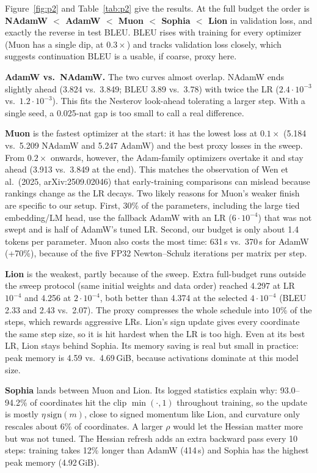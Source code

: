 \documentclass[11pt,a4paper]{article}
\begin{document}
Figure~\ref{fig:p2} and Table~\ref{tab:p2} give the results. At the full budget the order is \textbf{NAdamW $<$ AdamW $<$ Muon $<$ Sophia $<$ Lion} in validation loss, and exactly the reverse in test BLEU. BLEU rises with training for every optimizer (Muon has a single dip, at $0.3\times$) and tracks validation loss closely, which suggests continuation BLEU is a usable, if coarse, proxy here.

\textbf{AdamW vs.\ NAdamW.} The two curves almost overlap. NAdamW ends slightly ahead (3.824 vs.\ 3.849; BLEU 3.89 vs.\ 3.78) with twice the LR ($2.4\cdot10^{-3}$ vs.\ $1.2\cdot10^{-3}$). This fits the Nesterov look-ahead tolerating a larger step. With a single seed, a 0.025-nat gap is too small to call a real difference.

\textbf{Muon} is the fastest optimizer at the start: it has the lowest loss at $0.1\times$ (5.184 vs.\ 5.209 NAdamW and 5.247 AdamW) and the best proxy losses in the sweep. From $0.2\times$ onwards, however, the Adam-family optimizers overtake it and stay ahead (3.913 vs.\ 3.849 at the end). This matches the observation of Wen et al.\ (2025, arXiv:2509.02046) that early-training comparisons can mislead because rankings change as the LR decays. Two likely reasons for Muon's weaker finish are specific to our setup. First, 30\% of the parameters, including the large tied embedding/LM head, use the fallback AdamW with an LR ($6\cdot10^{-4}$) that was not swept and is half of AdamW's tuned LR. Second, our budget is only about 1.4 tokens per parameter. Muon also costs the most time: 631\,s vs.\ 370\,s for AdamW (+70\%), because of the five FP32 Newton--Schulz iterations per matrix per step.

\textbf{Lion} is the weakest, partly because of the sweep. Extra full-budget runs outside the sweep protocol (same initial weights and data order) reached 4.297 at LR $10^{-4}$ and 4.256 at $2\cdot10^{-4}$, both better than 4.374 at the selected $4\cdot10^{-4}$ (BLEU 2.33 and 2.43 vs.\ 2.07). The proxy compresses the whole schedule into 10\% of the steps, which rewards aggressive LRs. Lion's sign update gives every coordinate the same step size, so it is hit hardest when the LR is too high. Even at its best LR, Lion stays behind Sophia. Its memory saving is real but small in practice: peak memory is 4.59 vs.\ 4.69\,GiB, because activations dominate at this model size.

\textbf{Sophia} lands between Muon and Lion. Its logged statistics explain why: 93.0--94.2\% of coordinates hit the clip $\min(\cdot,1)$ throughout training, so the update is mostly $\eta\,\mathrm{sign}(m)$, close to signed momentum like Lion, and curvature only rescales about 6\% of coordinates. A larger $\rho$ would let the Hessian matter more but was not tuned. The Hessian refresh adds an extra backward pass every 10 steps: training takes 12\% longer than AdamW (414\,s) and Sophia has the highest peak memory (4.92\,GiB).
\end{document}
